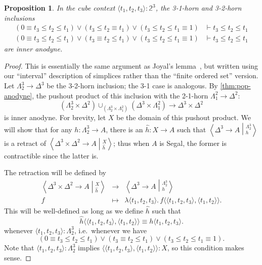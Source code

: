 \documentclass[12pt]{amsart}
\theoremstyle{plain}
\newtheorem{prop}[thm]{Proposition}
\theoremstyle{definition}
\theoremstyle{remark}
\numberwithin{equation}{section}
\newcommand{\ndexten}[4]{\left\langle #1 \to #2 \middle|^{#3}_{#4}\right\rangle}
\newcommand{\jdeq}{\equiv}
\newcommand{\types}{\vdash}
\newcommand{\pair}[1]{\langle #1\rangle}
\newcommand{\lam}[1]{\lambda #1.\,}
\newcommand{\two}{\mathbb{2}}
\begin{document}
\begin{prop}\label{thm:3horn-anodyne}
  In the cube context $    \pair{t_1,t_2,t_3}:\two^3$, the 3-1-horn and 3-2-horn inclusions
  \begin{align*}
(0\jdeq t_3\le t_2\le t_1) \lor (t_3\le t_2\jdeq t_1) \lor (t_3\le t_2\le t_1\jdeq 1) &\types t_3\le t_2\le t_1\\
 (0\jdeq t_3\le t_2\le t_1) \lor (t_3\jdeq t_2\le t_1) \lor (t_3\le t_2\le t_1\jdeq 1) &\types t_3\le t_2\le t_1
  \end{align*}
  are inner anodyne.
\end{prop}
\begin{proof}
  This is essentially the same argument as Joyal's lemma~\cite[2.3.2.1]{HTT}, but written using our ``interval'' description of simplices rather than the ``finite ordered set'' version.
  Let $\Lambda^3_2 \to \Delta^3$ be the 3-2-horn inclusion; the 3-1 case is analogous.
  By \cref{thm:pop-anodyne}, the pushout product of this inclusion with the 2-1-horn $\Lambda^2_1\to\Delta^2$:
  \[ (\Lambda^3_2 \times \Delta^2) \cup_{(\Lambda^3_2 \times \Lambda^2_1)} (\Delta^3\times\Lambda^2_1) \longrightarrow \Delta^3\times\Delta^2 \]
  is inner anodyne.
  For brevity, let $X$ be the domain of this pushout product.
  We will show that for any $h:\Lambda^3_2 \to A$, there is an $\hat h:X\to A$ such that $\ndexten{\Delta^3}{A}{\Lambda^3_2}{h}$ is a retract of $\ndexten{\Delta^3\times\Delta^2}{A}{X}{\hat h}$; thus when $A$ is Segal, the former is contractible since the latter is.

  The retraction will be defined by
  \[
  \begin{array}{ccc}
    \ndexten{\Delta^3\times\Delta^2}{A}{X}{\hat h} & \to &\ndexten{\Delta^3}{A}{\Lambda^3_2}{h} \\
    f & \mapsto & \lam{\pair{t_1,t_2,t_3}} f\pair{\pair{t_1,t_2,t_3},\pair{t_1,t_2}}.
  \end{array}
  \]
  This will be well-defined as long as we define $\hat h$ such that
  \[ \hat h\pair{\pair{t_1,t_2,t_3},\pair{t_1,t_2}} \jdeq h\pair{t_1,t_2,t_3}. \]
  whenever $\pair{t_1,t_2,t_3} : \Lambda^3_2$, i.e.\ whenever we have
  \[ (0\jdeq t_3\le t_2\le t_1) \lor (t_3\jdeq t_2\le t_1) \lor (t_3\le t_2\le t_1\jdeq 1). \]
  Note that $\pair{t_1,t_2,t_3} : \Lambda^3_2$ implies $\pair{\pair{t_1,t_2,t_3},\pair{t_1,t_2}}:X$, so this condition makes sense.


\end{proof}
\end{document}
